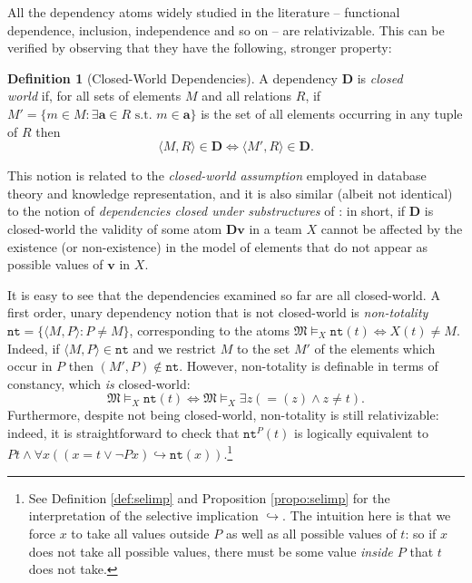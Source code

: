 \documentclass{article}
\theoremstyle{definition}
\newtheorem{Definition}[Theorem]{Definition}
\newcommand{\tuple}{\mathbf}
\newcommand{\M}{\mathfrak M}
\newcommand{\D}{\mathbf D}
\newcommand{\NT}{\texttt{nt}}
\begin{document}
All the dependency atoms widely studied in the literature -- functional dependence, inclusion, independence and so on -- are relativizable. This can be verified by observing that they have the following, stronger property: 
\begin{Definition}[Closed-World Dependencies]
	A dependency $\D$ is \emph{closed} \\\emph{world} if, for all sets of elements $M$ and all relations $R$, if $M' = \{m \in M: \exists \tuple a \in R \text{ s.t. } m \in \tuple a\}$ is the set of all elements occurring in any tuple of $R$ then 
	\[
		\langle M, R\rangle \in \D \Leftrightarrow \langle M', R \rangle \in \D.
	\]
\end{Definition}
This notion is related to the \emph{closed-world assumption} employed in database theory and knowledge representation, and it is also similar (albeit not identical) to the notion of \emph{dependencies closed under substructures} of \cite{kontinen2016decidability}: in short, if $\D$ is closed-world the validity of some atom $\D \tuple v$ in a team $X$ cannot be affected by the existence (or non-existence) in the model of elements that do not appear as possible values of $\tuple v$ in $X$.

It is easy to see that the dependencies examined so far are all closed-world. A first order, unary dependency notion that is not closed-world is \emph{non-totality} $\NT = \{\langle M, P\rangle : P \not = M\}$,
 corresponding to the atoms $\M \models_X \NT (t) \Leftrightarrow X(t) \not = M$.
Indeed, if $\langle M, P\rangle \in \NT$ and we restrict $M$ to the set $M'$ of the elements which occur in $P$ then $(M', P) \not \in \NT$. However, non-totality is definable in terms of constancy, which \emph{is} closed-world: 
\[
	\M \models_X \NT(t) \Leftrightarrow \M \models_X \exists z (=\!\!(z) \wedge z \not = t).
\]
Furthermore, despite not being closed-world, non-totality is still relativizable: indeed, it is straightforward to check that $\NT^P(t)$ is logically equivalent to $P t \wedge \forall x ( (x = t \vee \lnot P x) \hookrightarrow \NT(x))$.\footnote{See Definition \ref{def:selimp} and Proposition \ref{propo:selimp} for the interpretation of the selective implication $\hookrightarrow$. The intuition here is that we force $x$ to take all values outside $P$ as well as all possible values of $t$: so if $x$ does not take all possible values, there must be some value \emph{inside $P$} that $t$ does not take.}
\end{document}
